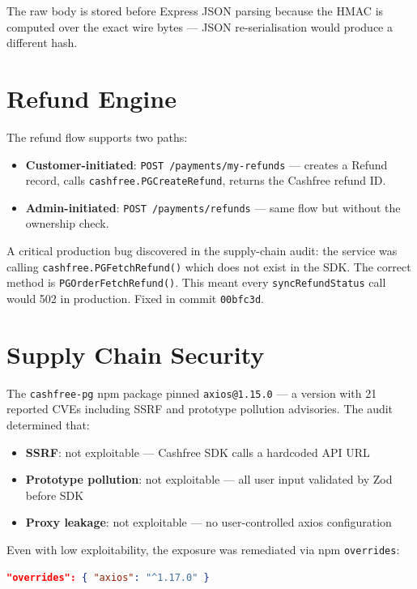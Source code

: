 \documentclass[11pt,a4paper,twoside]{book}
\begin{document}
The raw body is stored before Express JSON parsing because the HMAC is computed
over the exact wire bytes — JSON re-serialisation would produce a different hash.

\section{Refund Engine}

The refund flow supports two paths:

\begin{itemize}[leftmargin=1.4em]
  \item \textbf{Customer-initiated}: \texttt{POST /payments/my-refunds} — creates a Refund record, calls \texttt{cashfree.PGCreateRefund}, returns the Cashfree refund ID.
  \item \textbf{Admin-initiated}: \texttt{POST /payments/refunds} — same flow but without the ownership check.
\end{itemize}

A critical production bug discovered in the supply-chain audit: the service was
calling \texttt{cashfree.PGFetchRefund()} which does not exist in the SDK.  The
correct method is \texttt{PGOrderFetchRefund()}.  This meant every
\texttt{syncRefundStatus} call would 502 in production.  Fixed in commit
\texttt{00bfc3d}.

\section{Supply Chain Security}

The \texttt{cashfree-pg} npm package pinned \texttt{axios@1.15.0} — a version
with 21 reported CVEs including SSRF and prototype pollution advisories.
The audit determined that:

\begin{itemize}[leftmargin=1.4em]
  \item \textbf{SSRF}: not exploitable — Cashfree SDK calls a hardcoded API URL
  \item \textbf{Prototype pollution}: not exploitable — all user input validated by Zod before SDK
  \item \textbf{Proxy leakage}: not exploitable — no user-controlled axios configuration
\end{itemize}

Even with low exploitability, the exposure was remediated via npm \texttt{overrides}:

\begin{lstlisting}[language=json,caption={package.json axios override}]
"overrides": { "axios": "^1.17.0" }
\end{lstlisting}
\end{document}
